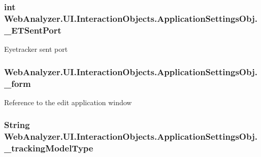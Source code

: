 \subsubsection[{\+\_\+\+E\+T\+Sent\+Port}]{\setlength{\rightskip}{0pt plus 5cm}int Web\+Analyzer.\+U\+I.\+Interaction\+Objects.\+Application\+Settings\+Obj.\+\_\+\+E\+T\+Sent\+Port\hspace{0.3cm}{\ttfamily [private]}}\label{class_web_analyzer_1_1_u_i_1_1_interaction_objects_1_1_application_settings_obj_a8101f556b9e66c46b27ade6cb57bdddd}


Eyetracker sent port 

\hypertarget{class_web_analyzer_1_1_u_i_1_1_interaction_objects_1_1_application_settings_obj_a6b08a377c6dc1e9f0e32d0c786012756}{}
\subsubsection[{\+\_\+form}]{ Web\+Analyzer.\+U\+I.\+Interaction\+Objects.\+Application\+Settings\+Obj.\+\_\+form\hspace{0.3cm}{\ttfamily [private]}}\label{class_web_analyzer_1_1_u_i_1_1_interaction_objects_1_1_application_settings_obj_a6b08a377c6dc1e9f0e32d0c786012756}


Reference to the edit application window 

\hypertarget{class_web_analyzer_1_1_u_i_1_1_interaction_objects_1_1_application_settings_obj_a46f28947ac5d858f82d174097a42f7ac}{}
\subsubsection[{\+\_\+tracking\+Model\+Type}]{\setlength{\rightskip}{0pt plus 5cm}String Web\+Analyzer.\+U\+I.\+Interaction\+Objects.\+Application\+Settings\+Obj.\+\_\+tracking\+Model\+Type\hspace{0.3cm}{\ttfamily [private]}}\label{class_web_analyzer_1_1_u_i_1_1_interaction_objects_1_1_application_settings_obj_a46f28947ac5d858f82d174097a42f7ac}


